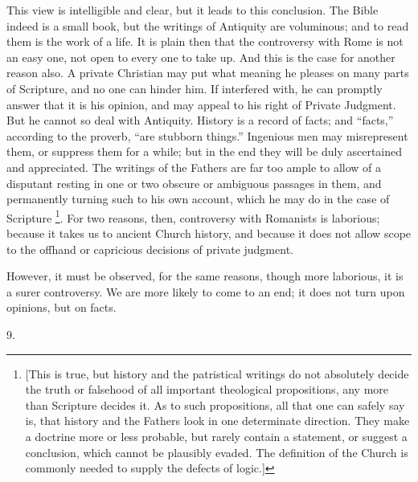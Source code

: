 This view is intelligible and clear, but it leads to this
conclusion. The Bible indeed is a small book, but the writings of
Antiquity are voluminous; and to read them is the work of a life. It
is plain then that the controversy with Rome is not an easy one, not
open to every one to take up. And this is the case for another reason
also. A private Christian may put what meaning he pleases on many
parts of Scripture, and no one can hinder him. If interfered with, he
can promptly answer that it is his opinion, and may appeal to his
right of Private Judgment. But he cannot so deal with Antiquity.
History is a record of facts; and ``facts,'' according to the
proverb, ``are stubborn things.'' Ingenious men may
misrepresent them, or suppress them for a while; but in the end they
will be duly ascertained and appreciated. The writings of the Fathers
are far too ample to allow of a disputant resting in one or two
obscure or ambiguous passages in them, and permanently turning such to
his own account, which he may do in the case of Scripture \footnote{[This is true, but history and the patristical writings do not
absolutely decide the truth or falsehood of all important theological
propositions, any more than Scripture decides it. As to such
propositions, all that one can safely say is, that history and the
Fathers look in one determinate direction. They make a doctrine more
or less probable, but rarely contain a statement, or suggest a
conclusion, which cannot be plausibly evaded. The definition of the
Church is commonly needed to supply the defects of logic.]}. For two reasons, then, controversy with Romanists is
laborious; because it takes us to ancient Church history, and because
it does not allow scope to the offhand or capricious decisions of
private judgment.

However, it must be observed, for the same reasons, though more
laborious, it is a surer controversy. We are more likely to come
to an end; it does not turn upon opinions, but on facts.

9.

